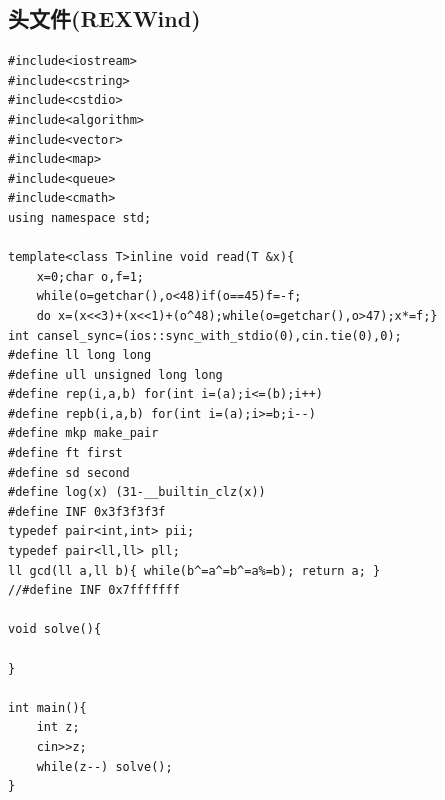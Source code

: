\documentclass[a4]{ctexart}
\begin{document}
\subsection{头文件(REXWind)}
\begin{lstlisting}
#include<iostream>
#include<cstring>
#include<cstdio>
#include<algorithm>
#include<vector>
#include<map>
#include<queue>
#include<cmath>
using namespace std;

template<class T>inline void read(T &x){
	x=0;char o,f=1;
	while(o=getchar(),o<48)if(o==45)f=-f;
	do x=(x<<3)+(x<<1)+(o^48);while(o=getchar(),o>47);x*=f;}
int cansel_sync=(ios::sync_with_stdio(0),cin.tie(0),0);
#define ll long long
#define ull unsigned long long
#define rep(i,a,b) for(int i=(a);i<=(b);i++)
#define repb(i,a,b) for(int i=(a);i>=b;i--)
#define mkp make_pair
#define ft first
#define sd second
#define log(x) (31-__builtin_clz(x))
#define INF 0x3f3f3f3f
typedef pair<int,int> pii;
typedef pair<ll,ll> pll;
ll gcd(ll a,ll b){ while(b^=a^=b^=a%=b); return a; }
//#define INF 0x7fffffff

void solve(){
	
}

int main(){
	int z;
	cin>>z;
	while(z--) solve();
}
\end{lstlisting}
\newpage
\end{document}
